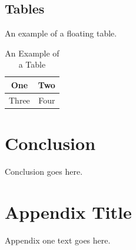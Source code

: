 \documentclass[12pt,journal,compsoc]{IEEEtran}
\begin{document}

\subsection{Tables}
An example of a floating table.

%
\begin{table}[h]
\renewcommand{\arraystretch}{1.3}
\caption{An Example of a Table}
\label{table_example}
\centering
\begin{tabular}{|c||c|}
\hline
One & Two\\
\hline
Three & Four\\
\hline
\end{tabular}
\end{table}




\section{Conclusion}
Conclusion goes here.

\appendices
\section{Appendix Title}
Appendix one text goes here.
\end{document}
